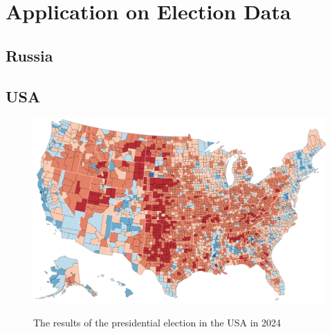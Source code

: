 \chapter{Application on Election Data} %





\section{Russia}

\section{USA} 





\begin{figure}[h]
    \centering
    \caption{The results of the presidential election in the USA in 2024}
    \includegraphics[width=0.75\linewidth]{BT-DT-eng/TemplateBT-DT/img/us_election_results.png}
    \label{fig:USA24-results}
\end{figure}

